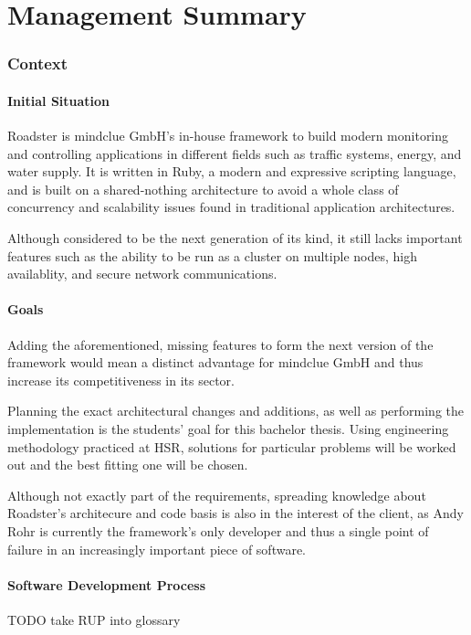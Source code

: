 \part*{Management Summary}\label{part:mgmtsummary}
\setcounter{secnumdepth}{0} %

\section*{Context}
\subsection*{Initial Situation}
Roadster is mindclue GmbH's in-house framework to build modern monitoring and
controlling applications in different fields such as traffic systems, energy,
and water supply. It is written in Ruby, a modern and expressive scripting
language, and is built on a shared-nothing architecture to avoid a whole class
of concurrency and scalability issues found in traditional application
architectures.

Although considered to be the next generation of its kind, it still lacks
important features such as the ability to be run as a cluster on multiple
nodes, high availablity, and secure network communications.

\subsection*{Goals}
Adding the aforementioned, missing features to form the next version of the
framework would mean a distinct advantage for mindclue GmbH and thus increase
its competitiveness in its sector.

Planning the exact architectural changes and additions, as well as performing
the implementation is the students' goal for this bachelor thesis. Using
engineering methodology practiced at HSR, solutions for particular problems
will be worked out and the best fitting one will be chosen.

Although not exactly part of the requirements, spreading knowledge about Roadster's
architecure and code basis is also in the interest of the client, as Andy Rohr
is currently the framework's only developer and thus a single point of failure
in an increasingly important piece of software.

\subsection*{Software Development Process}
TODO take RUP into glossary\\

